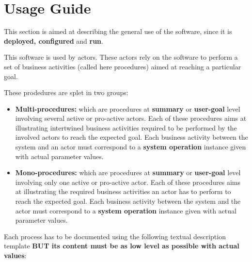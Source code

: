 \chapter{Usage Guide}
\label{chap:usage_guide}

This section is aimed at describing the general use of the software, since it is
\textbf{deployed, configured} and \textbf{run}.

This software is used by actors. These actors rely on the software to perform a
set of business activities (called here procedures) aimed at reaching a
particular goal. 

These prodedures are splet in two groups:
\begin{itemize}
  \item \textbf{Multi-procedures:} which are procedures at \textbf{summary} or
  \textbf{user-goal} level involving several active or pro-active actors.
  Each of these procedures aims at illustrating intertwined
  business activities required to be performed by the involved actors
  to reach the expected goal. Each business activity between the system and an
  actor must correspond to a \textbf{system operation} instance given with actual parameter values.

  \item \textbf{Mono-procedures:} which are procedures at \textbf{summary} or
  \textbf{user-goal} level involving only one active or pro-active actor.
  Each of these procedures aims at illustrating the required business
  activities an actor has to perform to reach the expected goal. Each business
  activity between the system and the actor must correspond to a \textbf{system
  operation} instance given with actual parameter values.

\end{itemize}




Each process has to be documented using the following textual description
template \cite{armour01usecase} \textbf{BUT its content must be as low level as possible with actual values}:













